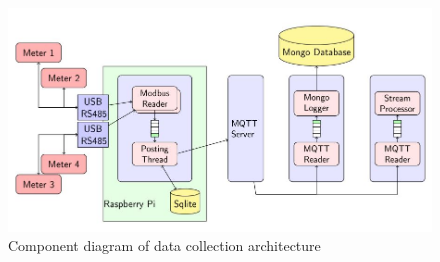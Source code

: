 \begin{figure} 
	\centering
	\includegraphics[width=1\linewidth]{images/dataCollection}
	\caption[Component diagram of data collection architecture]{Component diagram of data collection architecture}
	\label{fig:dataCollection}
\end{figure}
